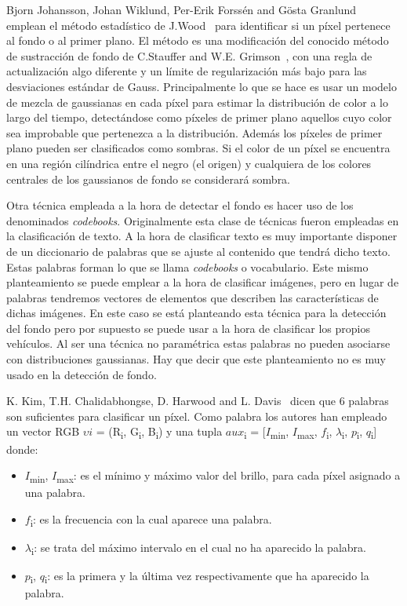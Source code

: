 Bjorn Johansson, Johan Wiklund, Per-Erik Forssén and Gösta  Granlund~\cite{combining_shadow} emplean el método estadístico de J.Wood~\cite{wood} para identificar si un píxel pertenece al fondo o al primer plano. El método es una modificación del conocido método de sustracción de fondo de  C.Stauffer and  W.E.  Grimson~\cite{adaptative_background}, con una regla de actualización algo diferente y un límite de regularización más bajo para las desviaciones estándar de Gauss. Principalmente lo que se hace es usar un modelo de mezcla de gaussianas en cada píxel para estimar la distribución de color a lo largo del tiempo, detectándose como píxeles de primer plano aquellos cuyo color sea improbable que pertenezca a la distribución. Además los píxeles de primer plano pueden ser clasificados como sombras. Si el color de un píxel se encuentra en una región cilíndrica entre el negro (el origen) y cualquiera de los colores centrales de los gaussianos de fondo se considerará sombra.


Otra técnica empleada a la hora de detectar el fondo es hacer uso de los denominados \textit{codebooks}. Originalmente esta clase de técnicas fueron empleadas en la clasificación de texto. A la hora de clasificar texto es muy importante disponer de un diccionario de palabras que se ajuste al contenido que tendrá dicho texto. Estas palabras forman lo que se llama  \textit{codebooks} o vocabulario. Este mismo planteamiento se puede emplear a la hora de clasificar imágenes, pero en lugar de palabras tendremos vectores de elementos que describen las características de dichas imágenes.
En este caso se está planteando esta técnica para la detección del fondo pero por supuesto se puede usar a la hora de clasificar los propios vehículos. Al ser una técnica no paramétrica estas palabras no pueden asociarse con distribuciones gaussianas. Hay que decir que este planteamiento no es muy usado en la detección de fondo.

K. Kim, T.H. Chalidabhongse, D. Harwood and L. Davis~\cite{real_time_foreground_background} dicen que 6 palabras son suficientes para clasificar un píxel. Como palabra los autores han empleado un vector RGB $\upsilon i$ = (R\textsubscript{i}, G\textsubscript{i}, B\textsubscript{i}) y una tupla $aux$\textsubscript{i} = [$I$\textsubscript{min}, $I$\textsubscript{max}, $f$\textsubscript{i}, $\lambda$\textsubscript{i}, $p$\textsubscript{i}, $q$\textsubscript{i}] donde:

\begin{itemize}
    \item $I$\textsubscript{min}, $I$\textsubscript{max}: es el mínimo y máximo valor del brillo, para cada píxel asignado a una palabra.
    \item $f$\textsubscript{i}: es la frecuencia con la cual aparece una palabra.
    \item $\lambda$\textsubscript{i}: se trata del máximo intervalo en el cual no ha aparecido la palabra.
    \item $p$\textsubscript{i}, $q$\textsubscript{i}: es la primera y la última vez respectivamente que ha aparecido la palabra.
\end{itemize}

